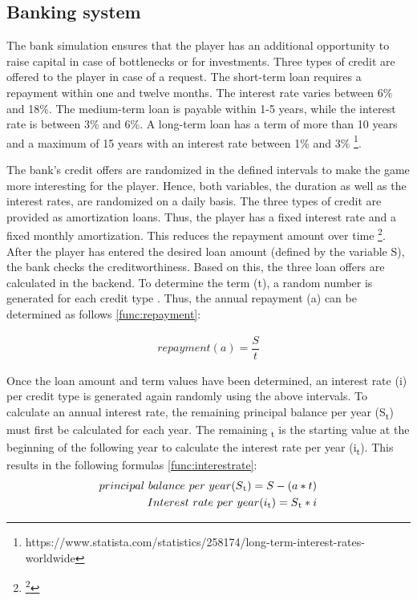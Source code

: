 \subsection{Banking system}
\label{sec: banking}

The bank simulation ensures that the player has an additional opportunity to raise capital in case of bottlenecks or for investments. Three types of credit are offered to the player in case of a request. 
The short-term loan requires a repayment within one and twelve months. The interest rate varies between 6\% and 18\%. The medium-term loan is payable within 1-5 years, while the interest rate is between 3\% and 6\%. A long-term loan has a term of more than 10 years and a maximum of 15 years with an interest rate between 1\% and 3\% \footnote{https://www.statista.com/statistics/258174/long-term-interest-rates-worldwide}. 

The bank's credit offers are randomized in the defined intervals to make the game more interesting for the player. Hence, both variables, the duration as well as the interest rates, are randomized on a daily basis. The three types of credit are provided as amortization loans. Thus, the player has a fixed interest rate and a fixed monthly amortization. This reduces the repayment amount over time \footnote{\footnote{https://www.investopedia.com/terms/a/amortized\_loan.asp}}.
After the player has entered the desired loan amount (defined by the variable S), the bank checks the creditworthiness. Based on this, the three loan offers are calculated in the backend. To determine the term (t), a random number is generated for each credit type . Thus, the annual repayment (a) can be determined as follows \ref{func:repayment}:

\begin{equation}
\label{func:repayment}
\begin{aligned}
repayment (a)= {\dfrac{S}{t}}
\end{aligned}    
\end{equation}

Once the loan amount and term values have been determined, an interest rate (i) per credit type is generated again randomly using the above intervals. To calculate an annual interest rate, the remaining principal balance per year (S\textsubscript{t}) must first be calculated for each year. The remaining \textsubscript{t}  is the starting value at the beginning of the following year to calculate the interest rate per year (i\textsubscript{t}). This results in the following formulas \ref{func:interestrate}:
\begin{equation}
\label{func:interestrate}
\begin{aligned}
principal \ balance \ per \ year (S\textsubscript{t})= S- (a*t)\\
Interest \ rate \ per \ year (i\textsubscript{t}) = S\textsubscript{t} * i
\end{aligned}    
\end{equation}

